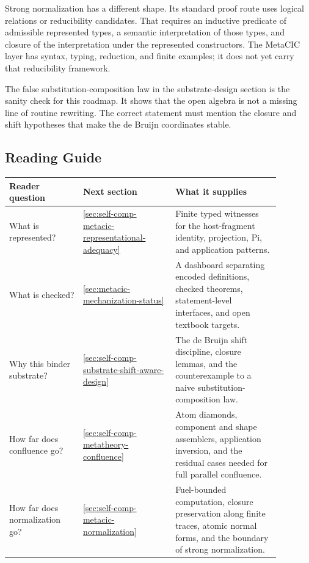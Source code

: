 Strong normalization has a different shape. Its standard proof route uses
logical relations or reducibility candidates. That requires an inductive
predicate of admissible represented types, a semantic interpretation of those
types, and closure of the interpretation under the represented constructors.
The MetaCIC layer has syntax, typing, reduction, and finite examples; it does
not yet carry that reducibility framework.

The false substitution-composition law in the substrate-design section is the
sanity check for this roadmap. It shows that the open algebra is not a missing
line of routine rewriting. The correct statement must mention the closure and
shift hypotheses that make the de Bruijn coordinates stable.

\subsection{Reading Guide}
\label{subsec:metatheory-roadmap-reading-guide}

\begin{center}
\begin{tabular}{p{0.24\linewidth}p{0.30\linewidth}p{0.34\linewidth}}
\hline
Reader question & Next section & What it supplies \\
\hline
What is represented? &
\autoref{sec:self-comp-metacic-representational-adequacy} &
Finite typed witnesses for the host-fragment identity, projection, Pi, and
application patterns. \\
What is checked? &
\autoref{sec:metacic-mechanization-status} &
A dashboard separating encoded definitions, checked theorems,
statement-level interfaces, and open textbook targets. \\
Why this binder substrate? &
\autoref{sec:self-comp-substrate-shift-aware-design} &
The de Bruijn shift discipline, closure lemmas, and the counterexample to a
naive substitution-composition law. \\
How far does confluence go? &
\autoref{sec:self-comp-metatheory-confluence} &
Atom diamonds, component and shape assemblers, application inversion, and the
residual cases needed for full parallel confluence. \\
How far does normalization go? &
\autoref{sec:self-comp-metacic-normalization} &
Fuel-bounded computation, closure preservation along finite traces, atomic
normal forms, and the boundary of strong normalization. \\
\hline
\end{tabular}
\end{center}

